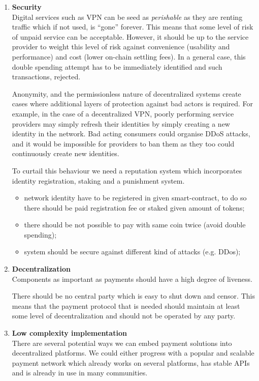 \documentclass[a4paper,12pt]{article}
\begin{document}
\begin{enumerate}
    \item \textbf{Security}\\
    Digital services such as VPN can be seed as \textit{perishable} as they are 
    renting traffic which if not used, is “gone” forever. This means that some 
    level of risk of unpaid service can be acceptable. However, it should be up 
    to the service provider to weight this level of risk against convenience 
    (usability and performance) and cost (lower on-chain settling fees). In a 
    general case, this double spending attempt has to be immediately identified 
    and such transactions, rejected.

    Anonymity, and the permissionless nature of decentralized systems create 
    cases where additional layers of protection against bad actors is required. 
    For example, in the case of a decentralized VPN, poorly performing service 
    providers may simply refresh their identities by simply creating a new 
    identity in the network. Bad acting consumers could organise DDoS attacks, 
    and it would be impossible for providers to ban them as they too could 
    continuously create new identities.

    To curtail this behaviour we need a reputation system which incorporates 
    identity registration, staking and a punishment system.

    \begin{itemize}
        \item network identity have to be registered in given smart-contract, to
        do so there should be paid registration fee or staked given amount of 
        tokens;
        \item there should be not possible to pay with same coin twice (avoid 
        double spending);
        \item system should be secure against different kind of attacks (e.g. 
        DDos);
    \end{itemize}

    \item \textbf{Decentralization}\\
    Components as important as payments should have a high degree of liveness.

    There should be no central party which is easy to shut down and censor. This
    means that the payment protocol that is needed should maintain at least some 
    level of decentralization and should not be operated by any party.

    \item \textbf{Low complexity implementation}\\
    There are several potential ways we can embed payment solutions into 
    decentralized platforms. We could either progress with a popular and scalable 
    payment network which already works on several platforms, has stable APIs and 
    is already in use in many communities.


\end{enumerate}
\end{document}
